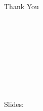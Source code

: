 \documentclass[9pt,aspectratio=169]{beamer}
\begin{document}
\begin{frame}[standout]
  \begin{center}
    {\Huge Thank You}
    \vspace{1cm}

    \separator

    \vspace{0.5cm}

    \begin{columns}[T,onlytextwidth]
        \centering
        {\normalsize\textbf{\AuthorOneName}\\
        \AuthorOneOrg\\
        \texttt{\AuthorOneEmail}}
        \centering
        {\normalsize\textbf{\AuthorTwoName}\\
        \AuthorTwoOrg\\
        \texttt{\AuthorTwoEmail}}
        \centering
        {\normalsize\textbf{\AuthorThreeName}\\
        \AuthorThreeOrg\\
        \texttt{\AuthorThreeEmail}}
    \end{columns}
    \vspace{2em}
    {\large Slides: \href{\TalkURL}{\TalkURL}}
  \end{center}
\end{frame}
\end{document}
